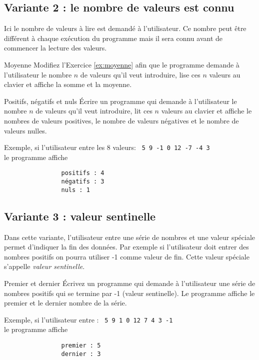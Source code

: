 \documentclass[a4paper,11pt]{style-esi/td}
\begin{document}
	\subsection{Variante 2 : le nombre de valeurs est connu}
	
		Ici le nombre de valeurs à lire est demandé à l'utilisateur.
		Ce nombre peut être différent à chaque exécution du programme mais il sera connu
		avant de commencer la lecture des valeurs.
		 

		\begin{Exercice}{Moyenne}
			Modifiez l'Exercice \ref{ex:moyenne} afin que le programme demande
			 à l'utilisateur le nombre $n$ de valeurs qu'il veut introduire,
			lise ces $n$ valeurs au clavier et affiche la somme et la moyenne. 
		\end{Exercice}

		\begin{Exercice}{Positifs, négatifs et nuls}
			\'Ecrire un programme qui demande à l'utilisateur 
			le nombre $n$ de valeurs qu'il veut introduire,
			lit ces $n$ valeurs au clavier et affiche le nombres de valeurs positives, 
			le nombre de valeurs négatives et le nombre de valeurs nulles. 
			
			Exemple, si l'utilisateur entre les 8 valeurs:
			\texttt{ 5 9 -1 0 12 -7 -4 3}
			\\le programme affiche
			\begin{verbatim}
				positifs : 4
				négatifs : 3
				nuls : 1
			\end{verbatim}
		\end{Exercice}

	\subsection{Variante 3 : valeur sentinelle}
	
		Dans cette variante, l'utilisateur entre une série de nombres et une valeur spéciale permet d'indiquer
		la fin des données. Par exemple si l'utilisateur doit entrer des nombres positifs on pourra utiliser -1
		comme valeur de fin. Cette valeur spéciale s'appelle \emph{valeur sentinelle}.

		\begin{Exercice}{Premier et dernier}
			\'Ecrivez un programme qui demande à l'utilisateur une série de nombres positifs 
			qui se termine par -1 (valeur sentinelle). 
			Le programme affiche le premier et le dernier nombre de la série.
		
			Exemple, si l'utilisateur entre :			
			\texttt{ 5 9 1 0 12 7 4 3 -1}
			\\le programme affiche
			\begin{verbatim}
				premier : 5
				dernier : 3
			\end{verbatim}

		\end{Exercice}
\end{document}

